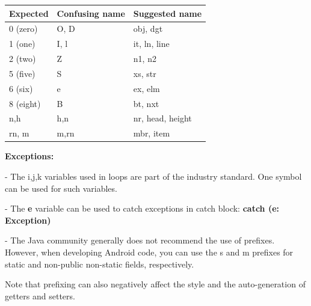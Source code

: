 {{{{{{{{\begin{center}

\begin{tabular}{ |p{5.0cm}|p{5.0cm}|p{5.0cm}| }

\hline

Expected&Confusing name&Suggested name\\

\hline

 0 (zero)      & O, D                     & obj, dgt         \\

 1 (one)       & I, l                     & it, ln, line     \\

 2 (two)       & Z                        & n1, n2           \\

 5 (five)      & S                        & xs, str          \\

 6 (six)       & e                        & ex, elm          \\

 8 (eight)     & B                        & bt, nxt          \\

 n,h           & h,n                      & nr, head, height \\

 rn, m         & m,rn                     & mbr, item        \\

\hline

\end{tabular}

\end{center}

\textbf{Exceptions:}

- The i,j,k variables used in loops are part of the industry standard. One symbol can be used for such variables.

- The \textbf{e} variable can be used to catch exceptions in catch block: \textbf{catch (e: Exception) {}}

- The Java community generally does not recommend the use of prefixes. However, when developing Android code, you can use the s and m prefixes for static and non-public non-static fields, respectively.

Note that prefixing can also negatively affect the style and the auto-generation of getters and setters.



}}}}}}}}
